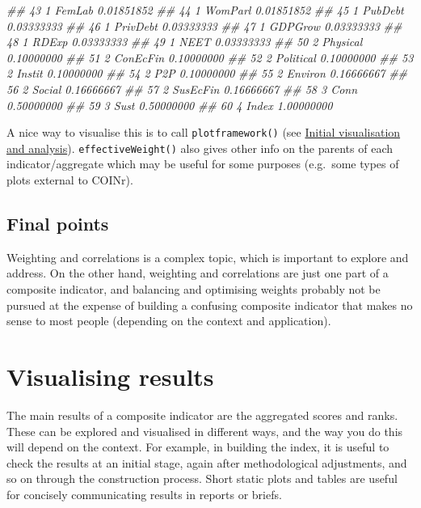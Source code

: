 \documentclass[
]{book}
\newenvironment{Shaded}{\begin{snugshade}}{\end{snugshade}}
\newcommand{\CommentTok}[1]{\textcolor[rgb]{0.56,0.35,0.01}{\textit{#1}}}
\begin{document}
\begin{Shaded}
\begin{Highlighting}[]
\CommentTok{## 43       1    FemLab      0.01851852}
\CommentTok{## 44       1   WomParl      0.01851852}
\CommentTok{## 45       1   PubDebt      0.03333333}
\CommentTok{## 46       1  PrivDebt      0.03333333}
\CommentTok{## 47       1   GDPGrow      0.03333333}
\CommentTok{## 48       1     RDExp      0.03333333}
\CommentTok{## 49       1      NEET      0.03333333}
\CommentTok{## 50       2  Physical      0.10000000}
\CommentTok{## 51       2  ConEcFin      0.10000000}
\CommentTok{## 52       2 Political      0.10000000}
\CommentTok{## 53       2    Instit      0.10000000}
\CommentTok{## 54       2       P2P      0.10000000}
\CommentTok{## 55       2   Environ      0.16666667}
\CommentTok{## 56       2    Social      0.16666667}
\CommentTok{## 57       2  SusEcFin      0.16666667}
\CommentTok{## 58       3      Conn      0.50000000}
\CommentTok{## 59       3      Sust      0.50000000}
\CommentTok{## 60       4     Index      1.00000000}
\end{Highlighting}
\end{Shaded}

A nice way to visualise this is to call \texttt{plotframework()} (see \protect\hyperlink{initial-visualisation-and-analysis}{Initial visualisation and analysis}). \texttt{effectiveWeight()} also gives other info on the parents of each indicator/aggregate which may be useful for some purposes (e.g.~some types of plots external to COINr).

\hypertarget{final-points}{%
\section{Final points}\label{final-points}}

Weighting and correlations is a complex topic, which is important to explore and address. On the other hand, weighting and correlations are just one part of a composite indicator, and balancing and optimising weights probably not be pursued at the expense of building a confusing composite indicator that makes no sense to most people (depending on the context and application).

\hypertarget{visualising-results}{%
\chapter{Visualising results}\label{visualising-results}}

The main results of a composite indicator are the aggregated scores and ranks. These can be explored and visualised in different ways, and the way you do this will depend on the context. For example, in building the index, it is useful to check the results at an initial stage, again after methodological adjustments, and so on through the construction process. Short static plots and tables are useful for concisely communicating results in reports or briefs.
\end{document}
